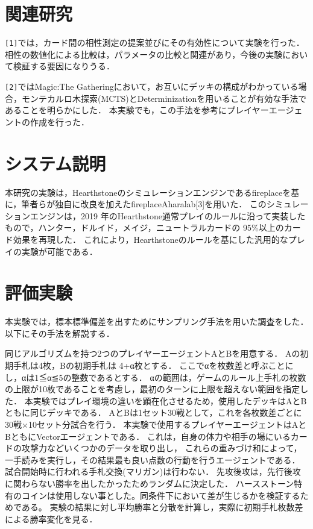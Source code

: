 \documentclass[twocolumn]{ltjsarticle}
\begin{document}
\section{関連研究}
\small{
  \verb#[1]#では，カード間の相性測定の提案並びにその有効性について実験を行った．
  相性の数値化による比較は，パラメータの比較と関連があり，今後の実験において検証する要因になりうる．

  \verb#[2]#ではMagic:The Gatheringにおいて，お互いにデッキの構成がわかっている場合，モンテカルロ木探索(MCTS)とDeterminizationを用いることが有効な手法であることを明らかにした．
  本実験でも，この手法を参考にプレイヤーエージェントの作成を行った．
}
\section{システム説明}
\small{
  本研究の実験は，Hearthstoneのシミュレーションエンジンであるfireplaceを基に，筆者らが独自に改良を加えたfireplaceAharalab[3]を用いた．
  このシミュレーションエンジンは，2019 年のHearthstone通常プレイのルールに沿って実装したもので，ハンター，ドルイド，メイジ，ニュートラルカードの 95\%以上のカード効果を再現した．
  これにより，Hearthstoneのルールを基にした汎用的なプレイの実験が可能である．
}
\section{評価実験}
\small{
  本実験では，標本標準偏差を出すためにサンプリング手法を用いた調査をした．
  以下にその手法を解説する．

  同じアルゴリズムを持つ2つのプレイヤーエージェントAとBを用意する．
  Aの初期手札は4枚，Bの初期手札は 4+α枚とする．
  ここでαを枚数差と呼ぶことにし，αは1≦α≦5の整数であるとする．
  αの範囲は，ゲームのルール上手札の枚数の上限が10枚であることを考慮し，最初のターンに上限を超えない範囲を指定した．
  本実験ではプレイ環境の違いを顕在化させるため，使用したデッキはAとBともに同じデッキである．
  AとBは1セット30戦として，これを各枚数差ごとに30戦×10セット分試合を行う．%
  本実験で使用するプレイヤーエージェントはAとBともにVectorエージェントである．
  これは，自身の体力や相手の場にいるカードの攻撃力などいくつかのデータを取り出し，
  これらの重みづけ和によって，一手読みを実行し，その結果最も良い点数の行動を行うエージェントである．
  試合開始時に行われる手札交換(マリガン)は行わない．
  先攻後攻は，先行後攻に関わらない勝率を出したかったためランダムに決定した．
  ハースストーン特有のコインは使用しない事とした。同条件下において差が生じるかを検証するためである。
  実験の結果に対し平均勝率と分散を計算し，実際に初期手札枚数差による勝率変化を見る．
}
\end{document}
